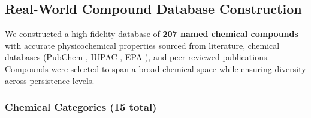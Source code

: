 \documentclass[11pt,letterpaper]{article}
\begin{document}
\subsection{Real-World Compound Database Construction}

We constructed a high-fidelity database of \textbf{207 named chemical compounds} with accurate physicochemical properties sourced from literature, chemical databases (PubChem \cite{PubChem2023}, IUPAC \cite{IUPAC2024}, EPA \cite{EPAPBT2024}), and peer-reviewed publications. Compounds were selected to span a broad chemical space while ensuring diversity across persistence levels.

\subsubsection{Chemical Categories (15 total)}
\end{document}
